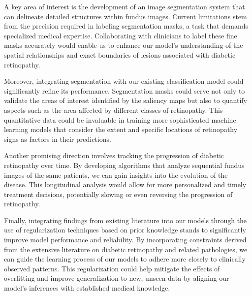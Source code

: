 A key area of interest is the development of an image segmentation system that can delineate detailed structures within fundus images. Current limitations stem from the precision required in labeling segmentation masks, a task that demands specialized medical expertise. Collaborating with clinicians to label these fine masks accurately would enable us to enhance our model's understanding of the spatial relationships and exact boundaries of lesions associated with diabetic retinopathy.

Moreover, integrating segmentation with our existing classification model could significantly refine its performance. Segmentation masks could serve not only to validate the areas of interest identified by the saliency maps but also to quantify aspects such as the area affected by different classes of retinopathy. This quantitative data could be invaluable in training more sophisticated machine learning models that consider the extent and specific locations of retinopathy signs as factors in their predictions.

Another promising direction involves tracking the progression of diabetic retinopathy over time. By developing algorithms that analyze sequential fundus images of the same patients, we can gain insights into the evolution of the disease. This longitudinal analysis would allow for more personalized and timely treatment decisions, potentially slowing or even reversing the progression of retinopathy.

Finally, integrating findings from existing literature into our models through the use of regularization techniques based on prior knowledge stands to significantly improve model performance and reliability. By incorporating constraints derived from the extensive literature on diabetic retinopathy and related pathologies, we can guide the learning process of our models to adhere more closely to clinically observed patterns. This regularization could help mitigate the effects of overfitting and improve generalization to new, unseen data by aligning our model's inferences with established medical knowledge.